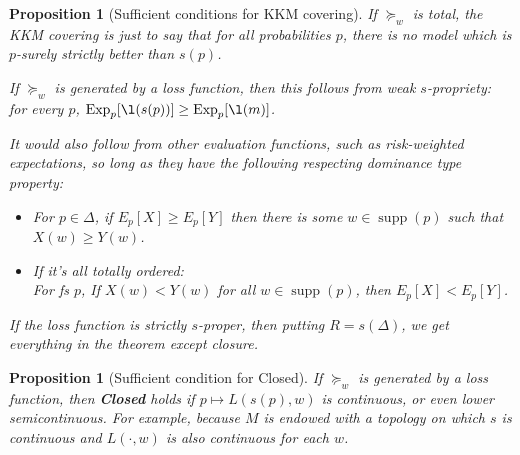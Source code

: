 \documentclass[11pt]{article}
\newtheorem{proposition}[theorem]{Proposition}
\theoremstyle{definition}
\theoremstyle{remark}
\newcommand{\supp}{\operatorname{supp}}
\newcommand{\Exp}{\operatorname{Exp}}
\begin{document}
\begin{proposition}[Sufficient conditions for KKM covering]
		If $\succeq_w$ is total, the KKM covering is just to say that for all probabilities $p$, there is no model which is $p$-surely strictly better than $s(p)$.		
		
		If $\succeq_w$ is generated by a loss function, then this follows from weak $s$-propriety: 
		for every $p$, $\Exp_p[\l(s(p))]\geq\Exp_p[\l(m)]$. 
	
		
		It would also follow from other evaluation functions, such as risk-weighted expectations, so long as they have the following respecting dominance type property: 
		\begin{itemize}
			\item For $p\in\Delta$, if $E_p[X]\geq E_p[Y]$ then there is some $w\in\supp(p)$ such that $X(w)\geq Y(w)$.
			\item If it's all totally ordered:\\
			For fs $p$, If $X(w)< Y(w)$ for all $w\in\supp(p)$, then $E_p[X]<E_p[Y]$. 
		\end{itemize}
		
		If the loss function is \emph{strictly} $s$-proper, then putting $R=s(\Delta)$, we get everything in the theorem except closure. 
\end{proposition}

\begin{proposition}[Sufficient condition for Closed]
	If $\succeq_w$ is generated by a loss function, then \textbf{Closed} holds if $p\mapsto L(s(p),w)$ is continuous, or even lower semicontinuous. For example, because $M$ is endowed with a topology on which $s$ is continuous and $L(\cdot,w)$ is also continuous for each $w$.  
\end{proposition}
\end{document}
